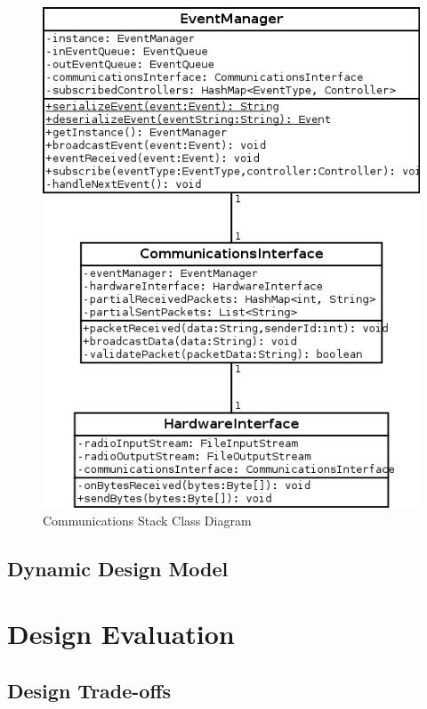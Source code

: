 \documentclass{report}
\begin{document}
\begin{figure}[p]
    \caption{Communications Stack Class Diagram}
    \label{fig:communications_stack_class_diagram}
    \includegraphics[scale=0.5]{communication_stack_class_diagram}
\end{figure}

\section{Dynamic Design Model}

\chapter{Design Evaluation} %
\label{ch:design-evaluation}

\section{Design Trade-offs}
\end{document}
